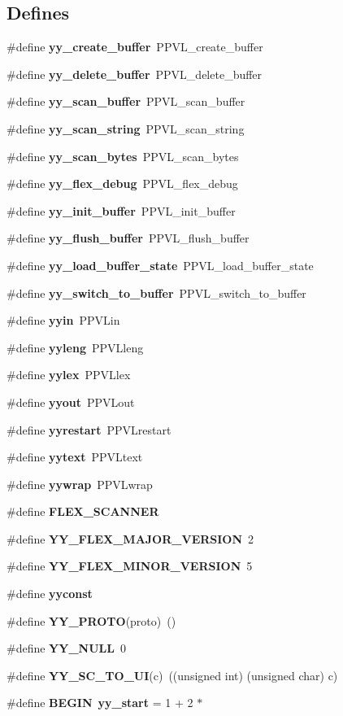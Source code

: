 \subsection*{Defines}
\begin{CompactItemize}
\item 
\#define {\bf yy\_\-create\_\-buffer}\ PPVL\_\-create\_\-buffer
\item 
\#define {\bf yy\_\-delete\_\-buffer}\ PPVL\_\-delete\_\-buffer
\item 
\#define {\bf yy\_\-scan\_\-buffer}\ PPVL\_\-scan\_\-buffer
\item 
\#define {\bf yy\_\-scan\_\-string}\ PPVL\_\-scan\_\-string
\item 
\#define {\bf yy\_\-scan\_\-bytes}\ PPVL\_\-scan\_\-bytes
\item 
\#define {\bf yy\_\-flex\_\-debug}\ PPVL\_\-flex\_\-debug
\item 
\#define {\bf yy\_\-init\_\-buffer}\ PPVL\_\-init\_\-buffer
\item 
\#define {\bf yy\_\-flush\_\-buffer}\ PPVL\_\-flush\_\-buffer
\item 
\#define {\bf yy\_\-load\_\-buffer\_\-state}\ PPVL\_\-load\_\-buffer\_\-state
\item 
\#define {\bf yy\_\-switch\_\-to\_\-buffer}\ PPVL\_\-switch\_\-to\_\-buffer
\item 
\#define {\bf yyin}\ PPVLin
\item 
\#define {\bf yyleng}\ PPVLleng
\item 
\#define {\bf yylex}\ PPVLlex
\item 
\#define {\bf yyout}\ PPVLout
\item 
\#define {\bf yyrestart}\ PPVLrestart
\item 
\#define {\bf yytext}\ PPVLtext
\item 
\#define {\bf yywrap}\ PPVLwrap
\item 
\#define {\bf FLEX\_\-SCANNER}
\item 
\#define {\bf YY\_\-FLEX\_\-MAJOR\_\-VERSION}\ 2
\item 
\#define {\bf YY\_\-FLEX\_\-MINOR\_\-VERSION}\ 5
\item 
\#define {\bf yyconst}
\item 
\#define {\bf YY\_\-PROTO}(proto)\ ()
\item 
\#define {\bf YY\_\-NULL}\ 0
\item 
\#define {\bf YY\_\-SC\_\-TO\_\-UI}(c)\ ((unsigned int) (unsigned char) c)
\item 
\#define {\bf BEGIN}\ {\bf yy\_\-start} = 1 + 2 $\ast$

\end{CompactItemize}
